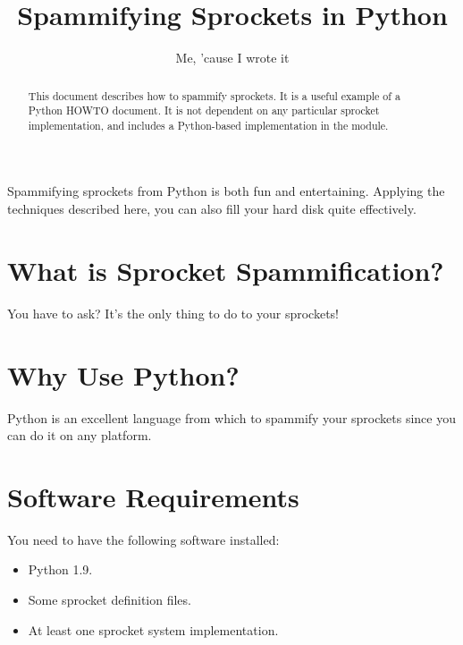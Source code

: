 \documentclass{howto}
\title{Spammifying Sprockets in Python}
\author{Me, 'cause I wrote it}
\begin{document}
\maketitle

\begin{abstract}
\noindent
This document describes how to spammify sprockets.  It is a useful
example of a Python HOWTO document.  It is not dependent on any
particular sprocket implementation, and includes a Python-based
implementation in the  module.
\end{abstract}

\tableofcontents

Spammifying sprockets from Python is both fun and entertaining.
Applying the techniques described here, you can also fill your hard
disk quite effectively.

\section{What is Sprocket Spammification?}

You have to ask?  It's the only thing to do to your sprockets!


\section{Why Use Python?}

Python is an excellent language from which to spammify your sprockets
since you can do it on any platform.


\section{Software Requirements}

You need to have the following software installed:

\begin{itemize}
  \item  Python 1.9.
  \item  Some sprocket definition files.
  \item  At least one sprocket system implementation.
\end{itemize}
\end{document}
